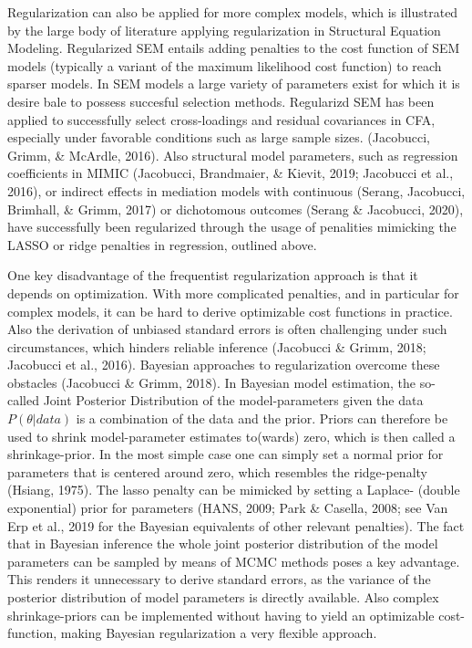 \documentclass[
  man, donotrepeattitle,floatsintext]{apa6}
\begin{document}
Regularization can also be applied for more complex models, which is illustrated by the large body of literature applying regularization in Structural Equation Modeling. Regularized SEM entails adding penalties to the cost function of SEM models (typically a variant of the maximum likelihood cost function) to reach sparser models. In SEM models a large variety of parameters exist for which it is desire bale to possess succesful selection methods. Regularizd SEM has been applied to successfully select cross-loadings and residual covariances in CFA, especially under favorable conditions such as large sample sizes. (Jacobucci, Grimm, \& McArdle, 2016). Also structural model parameters, such as regression coefficients in MIMIC (Jacobucci, Brandmaier, \& Kievit, 2019; Jacobucci et al., 2016), or indirect effects in mediation models with continuous (Serang, Jacobucci, Brimhall, \& Grimm, 2017) or dichotomous outcomes (Serang \& Jacobucci, 2020), have successfully been regularized through the usage of penalities mimicking the LASSO or ridge penalties in regression, outlined above.

One key disadvantage of the frequentist regularization approach is that it depends on optimization. With more complicated penalties, and in particular for complex models, it can be hard to derive optimizable cost functions in practice. Also the derivation of unbiased standard errors is often challenging under such circumstances, which hinders reliable inference (Jacobucci \& Grimm, 2018; Jacobucci et al., 2016). Bayesian approaches to regularization overcome these obstacles (Jacobucci \& Grimm, 2018). In Bayesian model estimation, the so-called Joint Posterior Distribution of the model-parameters given the data \(P({\theta} | data)\) is a combination of the data and the prior. Priors can therefore be used to shrink model-parameter estimates to(wards) zero, which is then called a shrinkage-prior. In the most simple case one can simply set a normal prior for parameters that is centered around zero, which resembles the ridge-penalty (Hsiang, 1975). The lasso penalty can be mimicked by setting a Laplace- (double exponential) prior for parameters (HANS, 2009; Park \& Casella, 2008; see Van Erp et al., 2019 for the Bayesian equivalents of other relevant penalties). The fact that in Bayesian inference the whole joint posterior distribution of the model parameters can be sampled by means of MCMC methods poses a key advantage. This renders it unnecessary to derive standard errors, as the variance of the posterior distribution of model parameters is directly available. Also complex shrinkage-priors can be implemented without having to yield an optimizable cost-function, making Bayesian regularization a very flexible approach.
\end{document}
